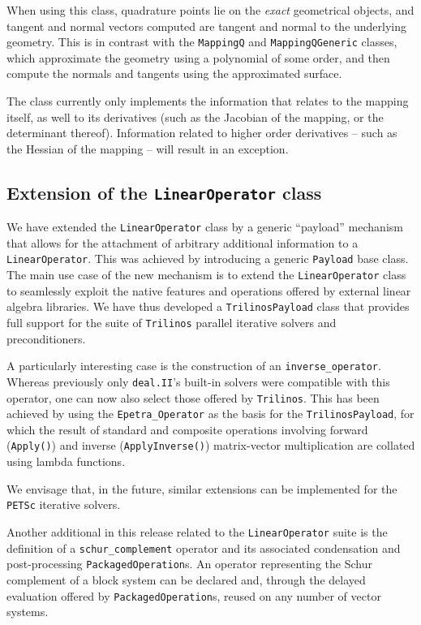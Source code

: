 \documentclass{ansarticle-preprint}
\newcommand{\specialword}[1]{\texttt{#1}}
\newcommand{\dealii}{{\specialword{deal.II}}}
\newcommand{\trilinos}{{\specialword{Trilinos}}}
\newcommand{\petsc}{\specialword{PETSc}}
\begin{document}
When using this class,
quadrature points lie on the \textit{exact}
geometrical objects, and tangent and normal vectors computed
are tangent and normal to the underlying geometry. This is
in contrast with the \texttt{MappingQ} and \texttt{MappingQGeneric}
classes, which approximate the geometry using a polynomial of some
order, and then compute the normals and tangents using the
approximated surface.

The class currently only implements the information that relates to
the mapping itself, as well to its derivatives (such as the Jacobian
of the mapping, or the determinant thereof). Information related to
higher order derivatives -- such as the Hessian of the mapping -- will
result in an exception.


\subsection{Extension of the \texttt{LinearOperator} class}

We have extended the \texttt{LinearOperator} class by a generic
``payload'' mechanism that allows for the attachment of arbitrary additional
information to a \texttt{LinearOperator}. This was achieved by introducing
a generic \texttt{Payload} base class. The main use case of the new
mechanism is to extend the \texttt{LinearOperator} class to seamlessly
exploit the native features and operations offered by external linear
algebra libraries. We have thus developed a \texttt{TrilinosPayload} class
that provides full support for the suite of {\trilinos} parallel iterative
solvers and preconditioners.

A particularly interesting case is the construction of an
\texttt{inverse\_operator}. Whereas previously only \dealii's built-in solvers
were compatible with this operator, one can now also select those
offered by {\trilinos}. This has been achieved by using
the \texttt{Epetra\_Operator} as the basis for the
\texttt{TrilinosPayload}, for which the result of standard and composite
operations involving forward (\texttt{Apply()}) and inverse
(\texttt{ApplyInverse()}) matrix-vector multiplication are collated using
lambda functions.

We envisage that, in the future, similar extensions can be implemented for the {\petsc}
iterative solvers.

Another additional in this release related to the \texttt{LinearOperator} suite is the definition
of a \texttt{schur\_complement} operator and its associated condensation
and post-processing \texttt{PackagedOperation}s. An operator representing
the Schur complement of a block system can be declared and, through the
delayed evaluation offered by \texttt{PackagedOperation}s, reused on any
number of vector systems.
\end{document}
